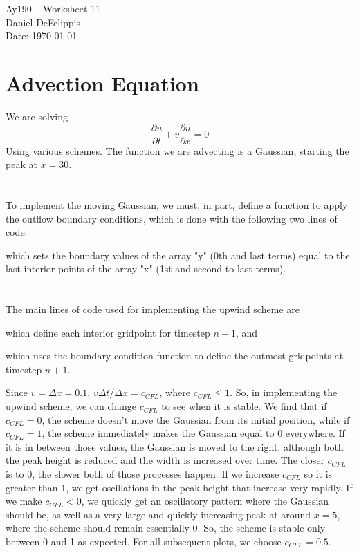\documentclass[11pt,letterpaper]{article}
\begin{document}
\begin{center}
\Large
Ay190 -- Worksheet 11\\
Daniel DeFelippis\\
Date: \today
\end{center}


\section*{Advection Equation}

We are solving
$$ \frac{\partial u}{\partial t} + v \frac{\partial u}{\partial x} = 0$$
Using various schemes. The function we are advecting is a Gaussian, starting
the peak at $x=30$. 

\section{}

To implement the moving Gaussian, we must, in part, define a function to apply
the outflow boundary conditions, which is done with the following two lines of code:

which sets the boundary values of the array "y" (0th and last terms) equal to the 
last interior points of the array "x" (1st and second to last terms). 

\section{}

The main lines of code used for implementing the upwind scheme are

which define each interior gridpoint for timestep $n+1$, and 

which uses the boundary condition function to define the outmost gridpoints
at timestep $n+1$.

Since $v = \Delta x = 0.1$, $v \Delta t / \Delta x = c_{CFL}$, where $c_{CFL} \leq 1$. 
So, in implementing the upwind scheme, we can change $c_{CFL}$ to see when it is stable.
We find that if $c_{CFL} = 0$, the scheme doesn't move the Gaussian from its initial
position, while if $c_{CFL} = 1$, the scheme immediately makes the Gaussian equal to $0$ 
everywhere. If it is in between those values, the Gaussian is moved to the right, 
although both the peak height is reduced and the width is increased over time. The closer
$c_{CFL}$ is to 0, the slower both of those processes happen. If we increase $c_{CFL}$ 
so it is greater than 1, we get oscillations in the peak height that increase very 
rapidly. If we make $c_{CFL} < 0$, we quickly get an oscillatory pattern where the 
Gaussian should be, as well as a very large and quickly increasing peak at around 
$x = 5$, where the scheme should remain essentially 0. So, the scheme is stable only
between 0 and 1 as expected. For all subsequent plots, we choose $c_{CFL} = 0.5$. 
\end{document}
